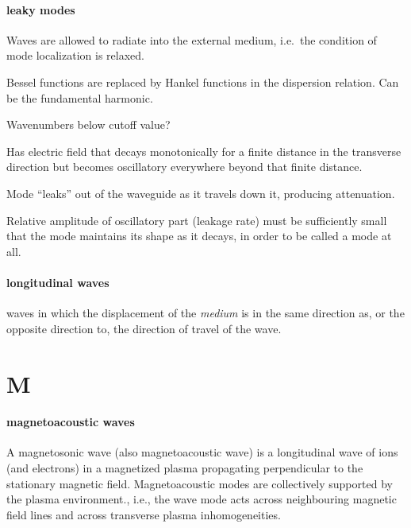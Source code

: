 \documentclass[12pt]{article}
\begin{document}
\paragraph{leaky modes}
\begin{itemize*}
    \item Waves are allowed to radiate into the external medium,
        i.e.\ the condition of mode localization is relaxed.
    \item Bessel functions are replaced by Hankel functions in the
        dispersion relation. Can be the fundamental harmonic.
    \item Wavenumbers below cutoff value?
    \item Has electric field that decays monotonically for a finite
        distance in the transverse direction but becomes oscillatory
        everywhere beyond that finite distance.
    \item Mode ``leaks'' out of
        the waveguide as it travels down it, producing attenuation.
    \item Relative amplitude of oscillatory part (leakage rate)
        must be sufficiently small that the mode maintains its
        shape as it decays, in order to be called a mode at all.
\end{itemize*}

\paragraph{longitudinal waves}
waves in which the displacement of the \emph{medium} is in the
same direction as, or the opposite direction to,
the direction of travel of the wave.

\section*{M}
\paragraph{magnetoacoustic waves}
A magnetosonic wave (also magnetoacoustic wave) is a longitudinal wave
of ions (and electrons) in a magnetized plasma propagating perpendicular
to the stationary magnetic field.
Magnetoacoustic modes are collectively supported by the plasma
environment., i.e., the wave mode acts across neighbouring magnetic field
lines and across transverse plasma inhomogeneities.
\end{document}
